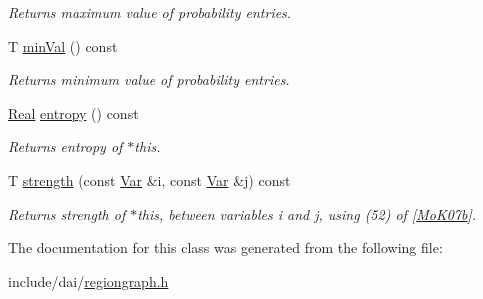 \begin{CompactItemize}
\begin{CompactList}\small\item\em Returns maximum value of probability entries. \item\end{CompactList}\item 
\hypertarget{classdai_1_1TFactor_891e98fd0cd9f65f945eb5733c6c3e9f}{
T \hyperlink{classdai_1_1TFactor_891e98fd0cd9f65f945eb5733c6c3e9f}{minVal} () const }
\label{classdai_1_1TFactor_891e98fd0cd9f65f945eb5733c6c3e9f}

\begin{CompactList}\small\item\em Returns minimum value of probability entries. \item\end{CompactList}\item 
\hypertarget{classdai_1_1TFactor_948c0013f741040ecdcad7da53377268}{
\hyperlink{namespacedai_e7d0472fdc89a8635825d01940e91cbf}{Real} \hyperlink{classdai_1_1TFactor_948c0013f741040ecdcad7da53377268}{entropy} () const }
\label{classdai_1_1TFactor_948c0013f741040ecdcad7da53377268}

\begin{CompactList}\small\item\em Returns entropy of $\ast$this. \item\end{CompactList}\item 
\hypertarget{classdai_1_1TFactor_4908ad29222b60d669d234d0805605b8}{
T \hyperlink{classdai_1_1TFactor_4908ad29222b60d669d234d0805605b8}{strength} (const \hyperlink{classdai_1_1Var}{Var} \&i, const \hyperlink{classdai_1_1Var}{Var} \&j) const }
\label{classdai_1_1TFactor_4908ad29222b60d669d234d0805605b8}

\begin{CompactList}\small\item\em Returns strength of $\ast$this, between variables i and j, using (52) of \mbox{[}\hyperlink{Bibliography_MoK07b}{MoK07b}\mbox{]}. \item\end{CompactList}\end{CompactItemize}


The documentation for this class was generated from the following file:\begin{CompactItemize}
\item 
include/dai/\hyperlink{regiongraph_8h}{regiongraph.h}\end{CompactItemize}
